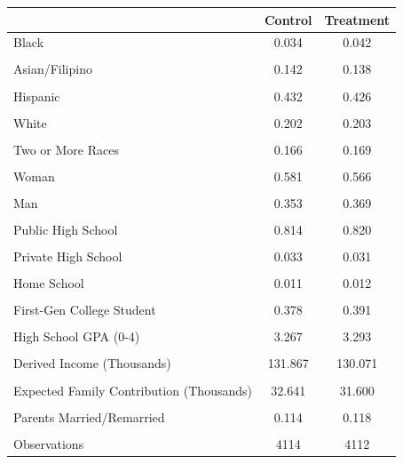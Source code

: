 \begin{tabular}{l*{2}{c}}
\toprule
                    &\multicolumn{1}{c}{Control}&\multicolumn{1}{c}{Treatment}\\
\midrule
Black               &       0.034&       0.042\\
                    &            &            \\
\addlinespace
Asian/Filipino      &       0.142&       0.138\\
                    &            &            \\
\addlinespace
Hispanic            &       0.432&       0.426\\
                    &            &            \\
\addlinespace
White               &       0.202&       0.203\\
                    &            &            \\
\addlinespace
Two or More Races   &       0.166&       0.169\\
                    &            &            \\
\addlinespace
Woman               &       0.581&       0.566\\
                    &            &            \\
\addlinespace
Man                 &       0.353&       0.369\\
                    &            &            \\
\addlinespace
Public High School  &       0.814&       0.820\\
                    &            &            \\
\addlinespace
Private High School &       0.033&       0.031\\
                    &            &            \\
\addlinespace
Home School         &       0.011&       0.012\\
                    &            &            \\
\addlinespace
First-Gen College Student&       0.378&       0.391\\
                    &            &            \\
\addlinespace
High School GPA (0-4)&       3.267&       3.293\\
                    &            &            \\
\addlinespace
Derived Income (Thousands)&     131.867&     130.071\\
                    &            &            \\
\addlinespace
Expected Family Contribution (Thousands)&      32.641&      31.600\\
                    &            &            \\
\addlinespace
Parents Married/Remarried&       0.114&       0.118\\
                    &            &            \\
\midrule
Observations        &        4114&        4112\\
\bottomrule
\end{tabular}
